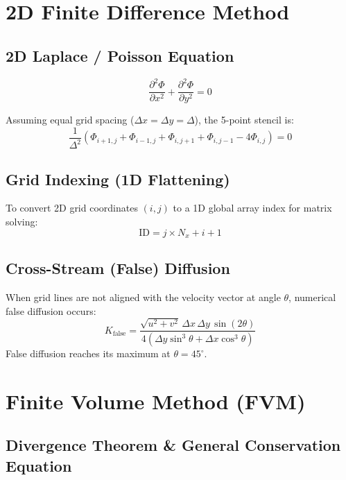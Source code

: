 \documentclass{article}
\begin{document}
\section{2D Finite Difference Method}

\subsection{2D Laplace / Poisson Equation}

\begin{equation}
    \frac{\partial^2\Phi}{\partial x^2} + \frac{\partial^2\Phi}{\partial y^2} = 0
\end{equation}

Assuming equal grid spacing ($\Delta x = \Delta y = \Delta$), the 5-point stencil is:
\begin{equation}
    \frac{1}{\Delta^2} \left( \Phi_{i+1, j} + \Phi_{i-1, j} + \Phi_{i, j+1} + \Phi_{i, j-1} - 4\Phi_{i,j} \right) = 0
\end{equation}

\subsection{Grid Indexing (1D Flattening)}

To convert 2D grid coordinates $(i,j)$ to a 1D global array index for matrix solving:
\begin{equation}
    \mathrm{ID} = j \times N_x + i + 1
\end{equation}

\subsection{Cross-Stream (False) Diffusion}

When grid lines are not aligned with the velocity vector at angle $\theta$, numerical false diffusion occurs:
\begin{equation}
    K_{\text{false}} = \frac{\sqrt{u^2 + v^2} \, \Delta x \, \Delta y \, \sin(2\theta)}{4(\Delta y \sin^3\theta + \Delta x \cos^3\theta)}
\end{equation}
False diffusion reaches its maximum at $\theta = 45^\circ$.

\section{Finite Volume Method (FVM)}

\subsection{Divergence Theorem \& General Conservation Equation}
\end{document}
